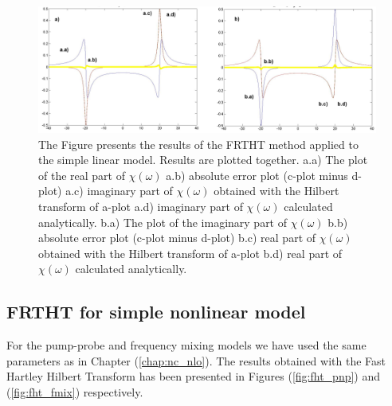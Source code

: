 \documentclass[12pt,twoside,a4paper]{article}
\numberwithin{equation}{subsection}
\numberwithin{figure}{subsection}
\begin{document}
\begin{figure} 
  \includegraphics[width=150mm]{img/fht_lin.png}
  \caption{The Figure presents the results of the FRTHT method applied to the simple linear model. Results are plotted together.
   a.a) The plot of the real part of $\chi (\omega )$ 
   a.b) absolute error plot (c-plot minus d-plot) 
   a.c) imaginary part of $\chi (\omega )$ obtained with the Hilbert transform of a-plot 
   a.d) imaginary part of $\chi (\omega )$  calculated analytically. 
   b.a) The plot of the imaginary part of $\chi (\omega )$ 
   b.b) absolute error plot (c-plot minus d-plot) 
   b.c) real part of $\chi (\omega )$ obtained with the Hilbert transform of a-plot 
   b.d) real part of $\chi (\omega )$ calculated analytically. \label{fig:fht_lin}
  }
\end{figure}

\subsection{FRTHT for simple nonlinear model} \label{chap:hartley_nlo}

For the pump-probe and frequency mixing models we have used the same parameters as in Chapter (\ref{chap:nc_nlo}). The results obtained with the Fast Hartley Hilbert Transform has been presented in Figures (\ref{fig:fht_pnp}) and (\ref{fig:fht_fmix}) respectively.
\end{document}
